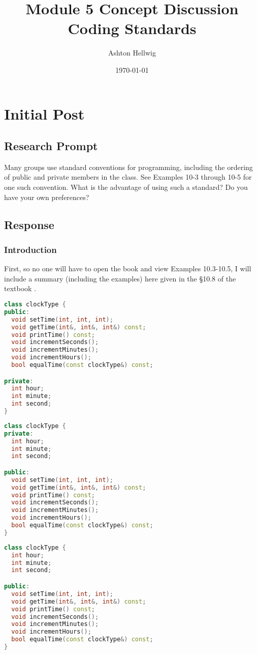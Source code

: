 \documentclass[12pt]{report}
\title{
    Module 5 Concept Discussion\\%
    \Large{Coding Standards}
  }
\author{Ashton Hellwig}
\date{\today}
\theoremstyle{definition}
\theoremstyle{plain}
\theoremstyle{plain}
\begin{document}
  \maketitle
  \tableofcontents
  \newpage


  \chapter{Initial Post}
    \vspace*{-10pt}
    \section*{Research Prompt}
      \begin{mdframed}[backgroundcolor=green!20]
        Many groups use standard conventions for programming, including the
          ordering of public and private members in the class. See Examples
          10-3 through 10-5 for one such convention. What is the advantage of
          using such a standard? Do you have your own preferences?
      \end{mdframed}
    \vspace{-15pt}
    \section{Response}
      \subsection{Introduction}
        First, so no one will have to open the book and view Examples 10.3-10.5,
          I will include a summary (including the examples) here given in the
          \S 10.8 of the textbook \autocite{malik2015}.
        \begin{lstlisting}[language=c++,caption={Example 10.3},label={e3}]
class clockType {
public:
  void setTime(int, int, int);
  void getTime(int&, int&, int&) const;
  void printTime() const;
  void incrementSeconds();
  void incrementMinutes();
  void incrementHours();
  bool equalTime(const clockType&) const;

private:
  int hour;
  int minute;
  int second;
}
        \end{lstlisting}
        \begin{lstlisting}[language=c++,caption={Example 10.4},label={e4}]
class clockType {
private:
  int hour;
  int minute;
  int second;

public:
  void setTime(int, int, int);
  void getTime(int&, int&, int&) const;
  void printTime() const;
  void incrementSeconds();
  void incrementMinutes();
  void incrementHours();
  bool equalTime(const clockType&) const;
}
        \end{lstlisting}
        \begin{lstlisting}[language=c++,caption={Example 10.5},label={e5}]
class clockType {
  int hour;
  int minute;
  int second;

public:
  void setTime(int, int, int);
  void getTime(int&, int&, int&) const;
  void printTime() const;
  void incrementSeconds();
  void incrementMinutes();
  void incrementHours();
  bool equalTime(const clockType&) const;
}
        \end{lstlisting}
\end{document}
